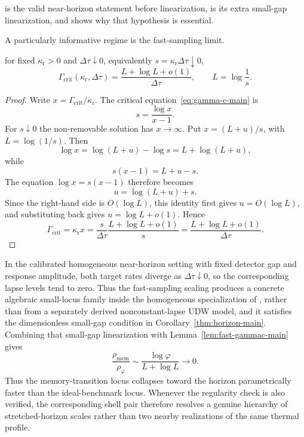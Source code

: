  is the valid near-horizon statement before
linearization,  is its extra small-gap linearization,
and  shows why that hypothesis is
essential.

A particularly informative regime is the fast-sampling limit.
\begin{lemma}\label{lem:fast-gammac-main}
\ModelAClause for fixed $\kappa_{\mathrm r}>0$ and $\Delta\tau\downarrow0$, equivalently $s=\kappa_{\mathrm r}\Delta\tau\downarrow0$,
\begin{equation}\label{eq:fast-sampling-main}
\Gamma_{\mathrm{crit}}(\kappa_{\mathrm r},\Delta\tau)
=
\frac{L+\log L+o(1)}{\Delta\tau},
\qquad
L=\log\frac{1}{s}.
\end{equation}
\end{lemma}

\begin{proof}
Write $x=\Gamma_{\mathrm{crit}}/\kappa_{\mathrm r}$. The critical equation~\eqref{eq:gamma-c-main} is
\[
s=\frac{\log x}{x-1}.
\]
For $s\downarrow0$ the non-removable solution has $x\to\infty$. Put $x=(L+u)/s$, with $L=\log(1/s)$. Then
\[
\log x
=\log(L+u)-\log s
=L+\log(L+u),
\]
while
\[
s(x-1)=L+u-s.
\]
The equation $\log x=s(x-1)$ therefore becomes
\[
u=\log(L+u)+s .
\]
Since the right-hand side is $O(\log L)$, this identity first gives $u=O(\log L)$, and substituting back gives
$u=\log L+o(1)$. Hence
\[
\Gamma_{\mathrm{crit}}=\kappa_{\mathrm r}x
=\frac{s}{\Delta\tau}\frac{L+\log L+o(1)}{s}
=\frac{L+\log L+o(1)}{\Delta\tau}.
\]
\end{proof}

In the calibrated homogeneous near-horizon setting with fixed detector gap and response amplitude, both target rates diverge as $\Delta\tau\downarrow0$, so the corresponding lapse levels tend to zero. Thus the fast-sampling scaling produces a concrete algebraic small-locus family inside the homogeneous specialization of , rather than from a separately derived nonconstant-lapse UDW model, and it satisfies the dimensionless small-gap condition in Corollary~\ref{thm:horizon-main}. Combining that small-gap linearization with Lemma~\ref{lem:fast-gammac-main} gives
\begin{equation}\label{eq:fast-ratio-main}
\frac{\rho_{\mathrm{mem}}}{\rho_{\varphi}}
\sim
\frac{\log\varphi}{L+\log L}
\longrightarrow0.
\end{equation}
Thus the memory-transition locus collapses toward the horizon parametrically faster than the ideal-benchmark locus. Whenever the regularity check is also verified, the corresponding shell pair therefore resolves a genuine hierarchy of stretched-horizon scales rather than two nearby realizations of the same thermal profile.

